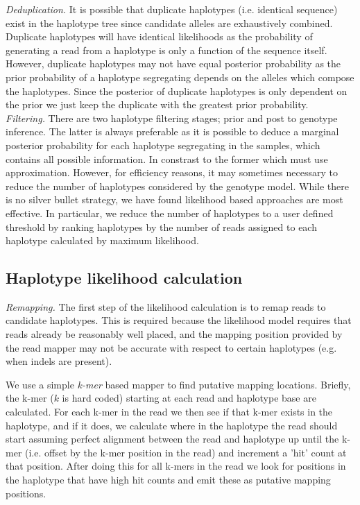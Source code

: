 \documentclass[notitlepage, twocolumn]{article}
\begin{document}
\emph{Deduplication.} It is possible that duplicate haplotypes (i.e. identical sequence) exist in the haplotype tree since candidate alleles are exhaustively combined. Duplicate haplotypes will have identical likelihoods as the probability of generating a read from a haplotype is only a function of the sequence itself. However, duplicate haplotypes may not have equal posterior probability as the prior probability of a haplotype segregating depends on the alleles which compose the haplotypes. Since the posterior of duplicate haplotypes is only dependent on the prior we just keep the duplicate with the greatest prior probability.\\

\emph{Filtering.} There are two haplotype filtering stages; prior and post to genotype inference. The latter is always preferable as it is possible to deduce a marginal posterior probability for each haplotype segregating in the samples, which contains all possible information. In constrast to the former which must use approximation. However, for efficiency reasons, it may sometimes necessary to reduce the number of haplotypes considered by the genotype model. While there is no silver bullet strategy, we have found likelihood based approaches are most effective. In particular, we reduce the number of haplotypes to a user defined threshold by ranking haplotypes by the number of reads assigned to each haplotype calculated by maximum likelihood.

\subsection*{Haplotype likelihood calculation}

\emph{Remapping.} The first step of the likelihood calculation is to remap reads to candidate haplotypes. This is required because the likelihood model requires that reads already be reasonably well placed, and the mapping position provided by the read mapper may not be accurate with respect to certain haplotypes (e.g. when indels are present).

We use a simple \emph{k-mer} based mapper to find putative mapping locations. Briefly, the k-mer ($k$ is hard coded) starting at each read and haplotype base are calculated. For each k-mer in the read we then see if that k-mer exists in the haplotype, and if it does, we calculate where in the haplotype the read should start assuming perfect alignment between the read and haplotype up until the k-mer (i.e. offset by the k-mer position in the read) and increment a 'hit' count at that position. After doing this for all k-mers in the read we look for positions in the haplotype that have high hit counts and emit these as putative mapping positions.\\
\end{document}
